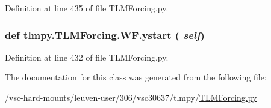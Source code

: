 Definition at line 435 of file TLMForcing.py.\hypertarget{classtlmpy_1_1TLMForcing_1_1WF_ad7292617ec6a1d86fd42a5b57d708f9f}{
\subsubsection[{ystart}]{\setlength{\rightskip}{0pt plus 5cm}def tlmpy.TLMForcing.WF.ystart ( {\em self})}}
\label{classtlmpy_1_1TLMForcing_1_1WF_ad7292617ec6a1d86fd42a5b57d708f9f}


Definition at line 432 of file TLMForcing.py.

The documentation for this class was generated from the following file:\begin{DoxyCompactItemize}
\item 
/vsc-\/hard-\/mounts/leuven-\/user/306/vsc30637/tlmpy/\hyperlink{TLMForcing_8py}{TLMForcing.py}\end{DoxyCompactItemize}
